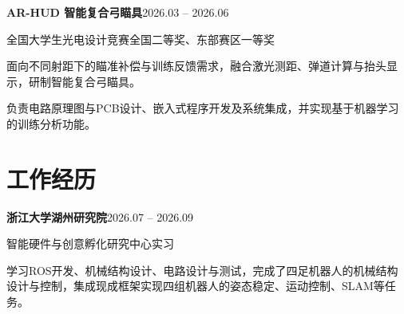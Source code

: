 \documentclass[11pt,a4paper]{article}
\newcommand{\projectheading}[3]{%
  \Needspace{6\baselineskip}%
  \noindent\textbf{#1}\hfill{\small\color{CVGray}#2}\par
  {\small\color{CVBlue}#3}\par\vspace{1pt}}
\newcommand{\projectgap}{\vspace{3pt}}
\begin{document}
\projectgap
\projectheading{AR-HUD 智能复合弓瞄具}{2026.03 -- 2026.06}{全国大学生光电设计竞赛全国二等奖、东部赛区一等奖}
面向不同射距下的瞄准补偿与训练反馈需求，融合激光测距、弹道计算与抬头显示，研制智能复合弓瞄具。\par
负责电路原理图与PCB设计、嵌入式程序开发及系统集成，并实现基于机器学习的训练分析功能。

\section{工作经历}
\projectheading{浙江大学湖州研究院}{2026.07 -- 2026.09}{智能硬件与创意孵化研究中心\qquad 实习}
学习ROS开发、机械结构设计、电路设计与测试，完成了四足机器人的机械结构设计与控制，集成现成框架实现四组机器人的姿态稳定、运动控制、SLAM等任务。
\end{document}
